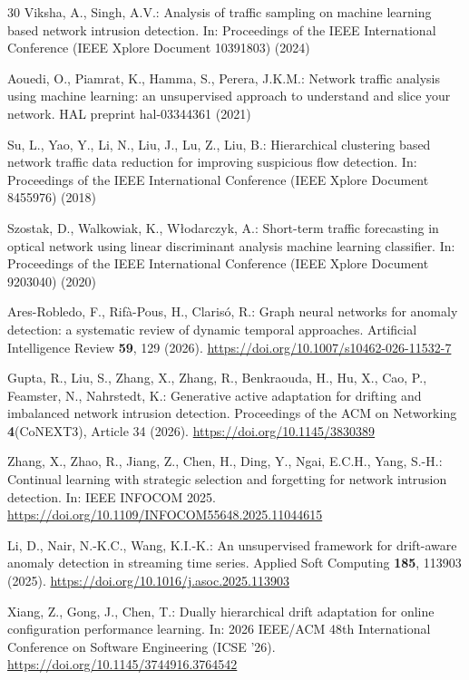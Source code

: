 \documentclass[twocolumn]{llncs}
\begin{document}
\begin{thebibliography}{30}
Viksha, A., Singh, A.V.: Analysis of traffic sampling on machine learning based network intrusion
detection. In: Proceedings of the IEEE International Conference (IEEE Xplore Document 10391803)
(2024)

Aouedi, O., Piamrat, K., Hamma, S., Perera, J.K.M.: Network traffic analysis using machine
learning: an unsupervised approach to understand and slice your network. HAL preprint
hal-03344361 (2021)

Su, L., Yao, Y., Li, N., Liu, J., Lu, Z., Liu, B.: Hierarchical clustering based network traffic
data reduction for improving suspicious flow detection. In: Proceedings of the IEEE International
Conference (IEEE Xplore Document 8455976) (2018)

Szostak, D., Walkowiak, K., W{\l}odarczyk, A.: Short-term traffic forecasting in optical network
using linear discriminant analysis machine learning classifier. In: Proceedings of the IEEE
International Conference (IEEE Xplore Document 9203040) (2020)

Ares-Robledo, F., Rif{\`a}-Pous, H., Claris{\'o}, R.: Graph neural networks for anomaly detection: a
systematic review of dynamic temporal approaches. Artificial Intelligence Review \textbf{59}, 129
(2026). \url{https://doi.org/10.1007/s10462-026-11532-7}

Gupta, R., Liu, S., Zhang, X., Zhang, R., Benkraouda, H., Hu, X., Cao, P., Feamster, N.,
Nahrstedt, K.: Generative active adaptation for drifting and imbalanced network intrusion
detection. Proceedings of the ACM on Networking \textbf{4}(CoNEXT3), Article 34 (2026).
\url{https://doi.org/10.1145/3830389}

Zhang, X., Zhao, R., Jiang, Z., Chen, H., Ding, Y., Ngai, E.C.H., Yang, S.-H.: Continual learning
with strategic selection and forgetting for network intrusion detection. In: IEEE INFOCOM 2025.
\url{https://doi.org/10.1109/INFOCOM55648.2025.11044615}

Li, D., Nair, N.-K.C., Wang, K.I.-K.: An unsupervised framework for drift-aware anomaly detection
in streaming time series. Applied Soft Computing \textbf{185}, 113903 (2025).
\url{https://doi.org/10.1016/j.asoc.2025.113903}

Xiang, Z., Gong, J., Chen, T.: Dually hierarchical drift adaptation for online configuration
performance learning. In: 2026 IEEE/ACM 48th International Conference on Software Engineering
(ICSE '26). \url{https://doi.org/10.1145/3744916.3764542}


\end{thebibliography}
\end{document}
